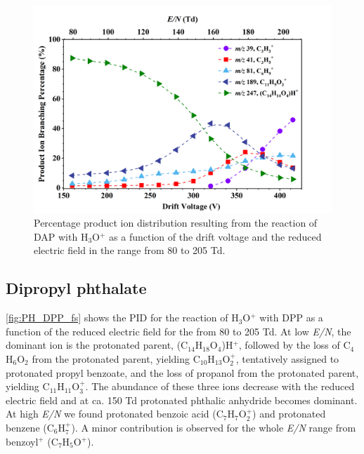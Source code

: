\begin{figure}[htbp]
\centering
\includegraphics[height=0.4\textheight]{pics/DAP-BR.png}
\caption{Percentage product ion distribution resulting from the reaction of DAP with H$_3$O$^+$ as a function of the drift voltage and the reduced electric field in the range from 80 to 205 Td.}
\label{fig:PH_DAP_fs}
\end{figure}


\subsection{Dipropyl phthalate}


\autoref{fig:PH_DPP_fs} shows the PID for the reaction of H$_3$O$^+$ with DPP as a function of the reduced electric field for the from 80 to 205 Td.
At low \textit{E/N}, the dominant ion is the protonated parent, (C$_{14}$H$_{18}$O$_4$)H$^+$, followed by the  loss of C$_4$H$_6$O$_2$ from the protonated parent, yielding C$_{10}$H$_{13}$O$_2^+$, tentatively assigned to protonated propyl benzoate, and the loss of propanol from the protonated parent, yielding C$_{11}$H$_{11}$O$_3^+$. The abundance of these three ions decrease with the reduced electric field and at ca. 150 Td protonated phthalic anhydride becomes dominant. At high \textit{E/N} we found protonated benzoic acid (C$_{7}$H$_{7}$O$_2^+$) and  protonated benzene (C$_6$H$_{7}^+$).
A minor contribution is observed for the whole \textit{E/N} range from benzoyl$^+$ (C$_7$H$_{5}$O$^+$).


